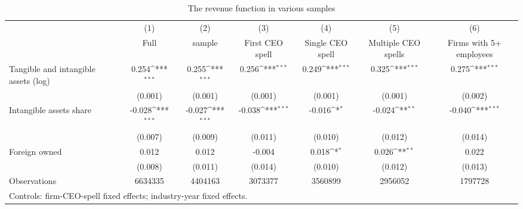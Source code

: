 \begin{table}[htbp]\centering
\def\sym#1{\ifmmode^{#1}\else\(^{#1}\)\fi}
\caption{The revenue function in various samples}
\begin{tabular}{l*{6}{c}}
\hline\hline
                    &\multicolumn{1}{c}{(1)}&\multicolumn{1}{c}{(2)}&\multicolumn{1}{c}{(3)}&\multicolumn{1}{c}{(4)}&\multicolumn{1}{c}{(5)}&\multicolumn{1}{c}{(6)}\\
                    &\multicolumn{1}{c}{Full}&\multicolumn{1}{c}{sample}&\multicolumn{1}{c}{First CEO spell}&\multicolumn{1}{c}{Single CEO spell}&\multicolumn{1}{c}{Multiple CEO spells}&\multicolumn{1}{c}{Firms with 5+ employees}\\
\hline
Tangible and intangible assets (log)&       0.254\sym{***}&       0.255\sym{***}&       0.256\sym{***}&       0.249\sym{***}&       0.325\sym{***}&       0.275\sym{***}\\
                    &     (0.001)         &     (0.001)         &     (0.001)         &     (0.001)         &     (0.001)         &     (0.002)         \\
[1em]
Intangible assets share&      -0.028\sym{***}&      -0.027\sym{***}&      -0.038\sym{***}&      -0.016\sym{*}  &      -0.024\sym{**} &      -0.040\sym{***}\\
                    &     (0.007)         &     (0.009)         &     (0.011)         &     (0.010)         &     (0.012)         &     (0.014)         \\
[1em]
Foreign owned       &       0.012         &       0.012         &      -0.004         &       0.018\sym{*}  &       0.026\sym{**} &       0.022         \\
                    &     (0.008)         &     (0.011)         &     (0.014)         &     (0.010)         &     (0.012)         &     (0.013)         \\
\hline
Observations        &     6634335         &     4404163         &     3073377         &     3560899         &     2956052         &     1797728         \\
\hline\hline
\multicolumn{7}{l}{\footnotesize Controls: firm-CEO-spell fixed effects; industry-year fixed effects.}\\
\end{tabular}
\end{table}
